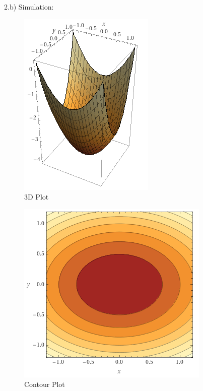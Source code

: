 \documentclass{homeworg}
\begin{document}
\noindent
2.b) Simulation:
\begin{figure}[!htb]
  \includegraphics[width=.3\textwidth]{fig04.png}
  \centering
  \caption{3D Plot}
\end{figure}
\begin{figure}[!htb]
  \includegraphics[width=.3\textwidth]{fig05.png}
  \centering
  \caption{Contour Plot}
\end{figure}
\end{document}
